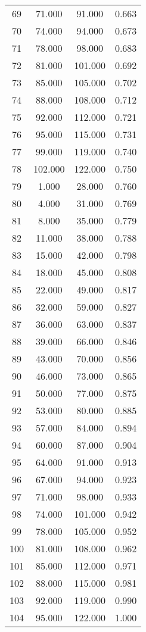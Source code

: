 \begin{tabular}{cccc}
  69 & 71.000 & 91.000 & 0.663 \\ 
  70 & 74.000 & 94.000 & 0.673 \\ 
  71 & 78.000 & 98.000 & 0.683 \\ 
  72 & 81.000 & 101.000 & 0.692 \\ 
  73 & 85.000 & 105.000 & 0.702 \\ 
  74 & 88.000 & 108.000 & 0.712 \\ 
  75 & 92.000 & 112.000 & 0.721 \\ 
  76 & 95.000 & 115.000 & 0.731 \\ 
  77 & 99.000 & 119.000 & 0.740 \\ 
  78 & 102.000 & 122.000 & 0.750 \\ 
  79 & 1.000 & 28.000 & 0.760 \\ 
  80 & 4.000 & 31.000 & 0.769 \\ 
  81 & 8.000 & 35.000 & 0.779 \\ 
  82 & 11.000 & 38.000 & 0.788 \\ 
  83 & 15.000 & 42.000 & 0.798 \\ 
  84 & 18.000 & 45.000 & 0.808 \\ 
  85 & 22.000 & 49.000 & 0.817 \\ 
  86 & 32.000 & 59.000 & 0.827 \\ 
  87 & 36.000 & 63.000 & 0.837 \\ 
  88 & 39.000 & 66.000 & 0.846 \\ 
  89 & 43.000 & 70.000 & 0.856 \\ 
  90 & 46.000 & 73.000 & 0.865 \\ 
  91 & 50.000 & 77.000 & 0.875 \\ 
  92 & 53.000 & 80.000 & 0.885 \\ 
  93 & 57.000 & 84.000 & 0.894 \\ 
  94 & 60.000 & 87.000 & 0.904 \\ 
  95 & 64.000 & 91.000 & 0.913 \\ 
  96 & 67.000 & 94.000 & 0.923 \\ 
  97 & 71.000 & 98.000 & 0.933 \\ 
  98 & 74.000 & 101.000 & 0.942 \\ 
  99 & 78.000 & 105.000 & 0.952 \\ 
  100 & 81.000 & 108.000 & 0.962 \\ 
  101 & 85.000 & 112.000 & 0.971 \\ 
  102 & 88.000 & 115.000 & 0.981 \\ 
  103 & 92.000 & 119.000 & 0.990 \\ 
  104 & 95.000 & 122.000 & 1.000 \\ 
   \hline
\end{tabular}
